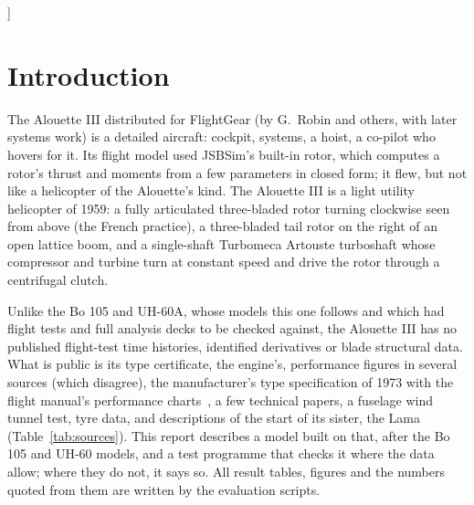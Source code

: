 \documentclass[10pt,a4paper,twocolumn]{article}
\begin{document}
\begin{@twocolumnfalse}
\begin{abstract}
\NWTopPct\,\% less than the manual. In ground effect it gains the charts' weight to within \NGeOffWorst{} of the ratio, off the standard
temperature too. In forward flight nothing is fitted, and the model needs less power than the published figures indicate: it climbs at
\NClimbHeavy\,m/s on the 405\,kW continuous rating against 4.3--5.5\,m/s published, and in cruise it burns
\NCrLessLo--\NCrLessHi\,\% less fuel than the manual's charts. That gap is documented, not tuned away. The start runs as published
(idle at \NStIdleRpm\,rpm against 15\,000--18\,000, the rotor taken up at \NStRotorRpm\,rpm of the engine against 19\,500--21\,000), and
in vertical descent the heave mode is unstable from \NVrsZeroLo{} to \NVrsZeroHi\,ft/min, the vortex ring state.
\end{abstract}
\vspace{6pt}
\end{@twocolumnfalse}
]

\section{Introduction}
The Alouette III distributed for FlightGear (by G.\ Robin and others, with later systems work) is a detailed aircraft: cockpit, systems,
a hoist, a co-pilot who hovers for it. Its flight model used JSBSim's built-in rotor, which computes a rotor's thrust and moments
from a few parameters in closed form; it flew, but not like a helicopter of the Alouette's kind. The Alouette III is a light utility
helicopter of 1959: a fully articulated three-bladed rotor turning clockwise seen from above (the French practice), a three-bladed
tail rotor on the right of an open lattice boom, and a single-shaft Turbomeca Artouste turboshaft whose compressor and turbine turn at
constant speed and drive the rotor through a centrifugal clutch.

Unlike the Bo 105 and UH-60A, whose models this one follows and which had flight tests and full analysis decks to be checked against, the
Alouette III has no published flight-test time histories, identified derivatives or blade structural data. What is public is its type
certificate, the engine's, performance figures in several sources (which disagree), the manufacturer's type specification of 1973 with
the flight manual's performance charts~\cite{spec}, a few technical papers, a fuselage wind tunnel test, tyre data, and descriptions
of the start of its sister, the Lama (Table~\ref{tab:sources}). This report describes a model built on that,
after the Bo 105 and UH-60 models, and a test programme that checks it where the data allow; where they do not, it says so. All result
tables, figures and the numbers quoted from them are written by the evaluation scripts.
\end{document}
